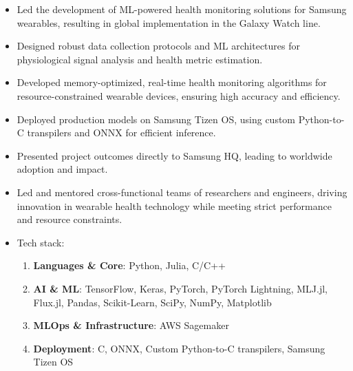 {  
  \begin{itemize}
    \item Led the development of ML-powered health monitoring solutions for Samsung wearables, resulting in global implementation in the Galaxy Watch line.
    \item Designed robust data collection protocols and ML architectures for physiological signal analysis and health metric estimation.
    \item Developed memory-optimized, real-time health monitoring algorithms for resource-constrained wearable devices, ensuring high accuracy and efficiency.
    \item Deployed production models on Samsung Tizen OS, using custom Python-to-C transpilers and ONNX for efficient inference.
    \item Presented project outcomes directly to Samsung HQ, leading to worldwide adoption and impact.
    \item Led and mentored cross-functional teams of researchers and engineers, driving innovation in wearable health technology while meeting strict performance and resource constraints.
    \item Tech stack:
      \begin{enumerate}
        \item \textbf{Languages \& Core}: {\color{accent2}Python, Julia, C/C++}
        \item \textbf{AI \& ML}: {\color{accent2}TensorFlow, Keras, PyTorch, PyTorch Lightning, MLJ.jl, Flux.jl, Pandas, Scikit-Learn, SciPy, NumPy, Matplotlib}
        \item \textbf{MLOps \& Infrastructure}: {\color{accent2}AWS Sagemaker}
        \item \textbf{Deployment}: {\color{accent2}C, ONNX, Custom Python-to-C transpilers, Samsung Tizen OS}
      \end{enumerate}
  \end{itemize}

  \divider

}
